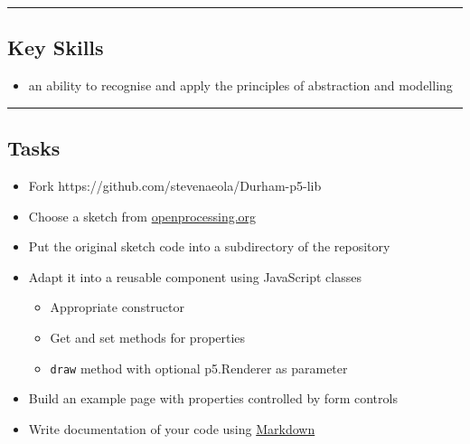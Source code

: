 \documentclass{article}[18pt]
\providecommand{\tightlist}{%
	\setlength{\itemsep}{0pt}\setlength{\parskip}{0pt}}
\begin{document}
\begin{center}\rule{0.5\linewidth}{\linethickness}\end{center}

\hypertarget{key-skills}{%
	\subsection{Key Skills}\label{key-skills}}

\begin{itemize}
	\tightlist
	\item
	an ability to recognise and apply the principles of abstraction and
	modelling
\end{itemize}

\begin{center}\rule{0.5\linewidth}{\linethickness}\end{center}

\hypertarget{tasks}{%
	\subsection{Tasks}\label{tasks}}

\begin{itemize}
	\tightlist
	\item
	Fork https://github.com/stevenaeola/Durham-p5-lib
	\item
	Choose a sketch from
	\href{https://www.openprocessing.org/}{openprocessing.org}
	\item
	Put the original sketch code into a subdirectory of the repository
	\item
	Adapt it into a reusable component using JavaScript classes
	
	\begin{itemize}
		\tightlist
		\item
		Appropriate constructor
		\item
		Get and set methods for properties
		\item
		\texttt{draw} method with optional p5.Renderer as parameter
	\end{itemize}
\end{itemize}

\begin{itemize}
	\tightlist
	\item
	Build an example page with properties controlled by form controls
	\item
	Write documentation of your code using
	\href{https://guides.github.com/features/mastering-markdown/}{Markdown}
\end{itemize}
\end{document}
